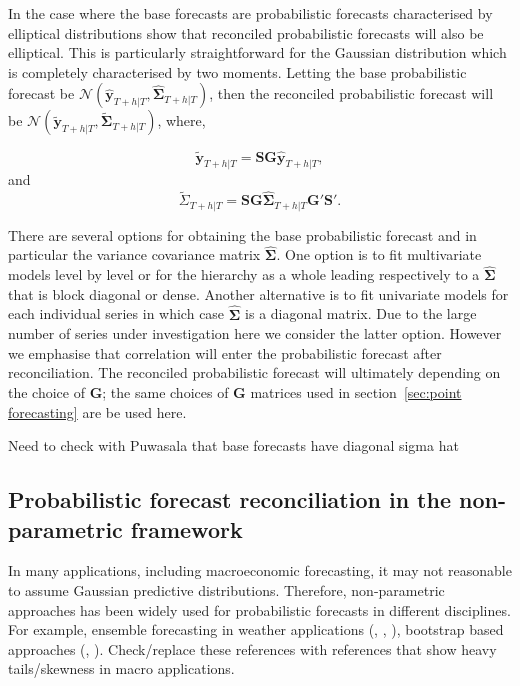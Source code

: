 \documentclass[graybox]{svmult}
\begin{document}
In the case where the base forecasts are probabilistic forecasts characterised by elliptical distributions \cite{Gamakumara2018} show that reconciled probabilistic forecasts will also be elliptical.  This is particularly straightforward for the Gaussian distribution which is completely characterised by two moments.  Letting the base probabilistic forecast be $\mathscr{N}(\bm{\hat{y}}_{T+h|T}, \hat{\bm{\Sigma}}_{T+h|T})$, then the reconciled probabilistic forecast will be $\mathscr{N}(\bm{\tilde{y}}_{T+h|T}, \tilde{\bm{\Sigma}}_{T+h|T})$, where,

\begin{equation}\label{eq:rec mean}
\bm{\tilde{y}}_{T+h|T} = \bm{SG}\bm{\hat{y}}_{T+h|T},
\end{equation}
and
\begin{equation}\label{eq:rec var}
\tilde{\Sigma}_{T+h|T} = \bm{SG}\hat{\bm{\Sigma}}_{T+h|T}\bm{G'S'}.
\end{equation}

There are several options for obtaining the base probabilistic forecast and in particular the variance covariance matrix $\hat{\bm{\Sigma}}$.  One option is to fit multivariate models level by level or for the hierarchy as a whole leading respectively to a $\hat{\bm \Sigma}$ that is block diagonal or dense.  Another alternative is to fit univariate models for each individual series in which case $\hat{\bm{\Sigma}}$ is a diagonal matrix. Due to the large number of series under investigation here we consider the latter option.  However we emphasise that correlation will enter the probabilistic forecast after reconciliation.  The reconciled probabilistic forecast will ultimately depending on the choice of $\bm{G}$; the same choices of $\bm{G}$ matrices used in section~\ref{sec:point forecasting} are be used here.

{\color{red} Need to check with Puwasala that base forecasts have diagonal sigma hat}

\subsection{Probabilistic forecast reconciliation in the non-parametric framework}

In many applications, including macroeconomic forecasting, it may not reasonable to assume Gaussian predictive distributions. Therefore, non-parametric approaches has been widely used for probabilistic forecasts in different disciplines. For example, ensemble forecasting in weather applications (\cite{Gneiting2005}, \cite{Gneiting2014}, \cite{Gneiting2008}), bootstrap based approaches (\cite{Manzan2008}, \cite{Vilar2013}). {\color{red} Check/replace these references with references that show heavy tails/skewness in macro applications.}
\end{document}
